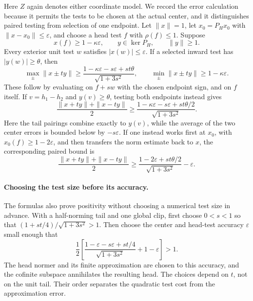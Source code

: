 Here $Z$ again denotes either coordinate model. We record the error
calculation because it permits the tests to be
chosen at the actual center, and it distinguishes paired testing from
selection of one endpoint. Let $\|x\|=1$, let $x_0=P_Hx_0$ with
$\|x-x_0\|\le\varepsilon$, and choose a head test $f$ with
$\rho(f)\le1$. Suppose
\[
 x(f)\ge1-\kappa\varepsilon,
 \qquad y\in\ker P_H,\qquad \|y\|\ge1.
\]
Every exterior unit test $w$ satisfies $|x(w)|\le\varepsilon$.
If a selected inward test has $|y(w)|\ge\theta$, then
\begin{equation}\label{clip:approx-selected}
 \max_\pm\|x\pm ty\|\ge
 \frac{1-\kappa\varepsilon-s\varepsilon+st\theta}
      {\sqrt{1+3s^2}},
 \qquad \min_\pm\|x\pm ty\|\ge1-\kappa\varepsilon.
\end{equation}
These follow by evaluating on $f+sw$ with the chosen endpoint sign,
and on $f$ itself. If $v=h_1-h_2$ and $y(v)\ge\theta$, testing
both endpoints instead gives
\begin{equation}\label{clip:approx-paired}
 \frac{\|x+ty\|+\|x-ty\|}{2}
 \ge\frac{1-\kappa\varepsilon-s\varepsilon+st\theta/2}
           {\sqrt{1+3s^2}}.
\end{equation}
Here the tail pairings combine exactly to $y(v)$, while the average
of the two center errors is bounded below by $-s\varepsilon$.
If one instead works first at $x_0$, with $x_0(f)\ge1-2\varepsilon$,
and then transfers the norm estimate back to $x$, the corresponding
paired bound is
\begin{equation}\label{clip:finite-transfer}
 \frac{\|x+ty\|+\|x-ty\|}{2}
 \ge\frac{1-2\varepsilon+st\theta/2}{\sqrt{1+3s^2}}
       -\varepsilon.
\end{equation}

\paragraph{Choosing the test size before its accuracy.}
\label{clip:ordered-accuracy}
The formulas also prove positivity without choosing a numerical test
size in advance. With a half-norming tail and one global clip, first
choose $0<s<1$ so that
$(1+st/4)/\sqrt{1+3s^2}>1$. Then choose the center and head-test
accuracy $\varepsilon$ small enough that
\[
 \frac12\left[
 \frac{1-\varepsilon-s\varepsilon+st/4}{\sqrt{1+3s^2}}
      +1-\varepsilon\right]>1.
\]
The head normer and its finite approximation are chosen to this
accuracy, and the cofinite subspace annihilates the resulting head.
The choices depend on $t$, not on the unit tail. Their order separates
the quadratic test cost from the approximation error.

